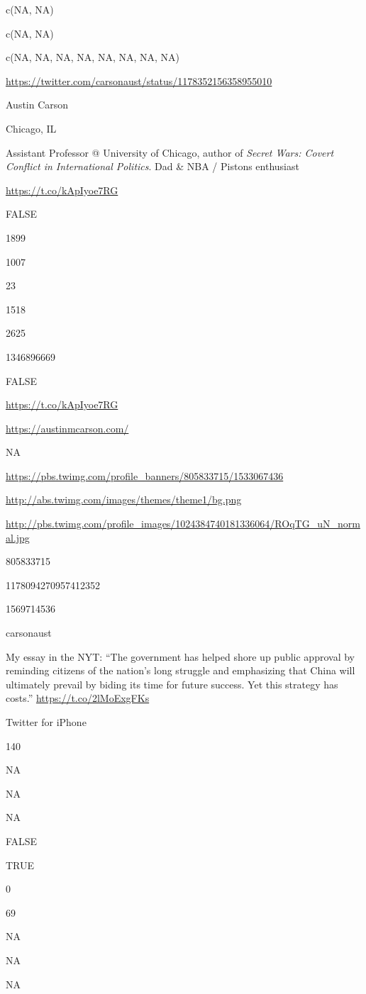 \documentclass[]{book}
\begin{document}
c(NA, NA)

c(NA, NA)

c(NA, NA, NA, NA, NA, NA, NA, NA)

\url{https://twitter.com/carsonaust/status/1178352156358955010}

Austin Carson

Chicago, IL

Assistant Professor @ University of Chicago, author of \emph{Secret
Wars: Covert Conflict in International Politics}. Dad \& NBA / Pistons
enthusiast

\url{https://t.co/kApIyoe7RG}

FALSE

1899

1007

23

1518

2625

1346896669

FALSE

\url{https://t.co/kApIyoe7RG}

\url{https://austinmcarson.com/}

NA

\url{https://pbs.twimg.com/profile_banners/805833715/1533067436}

\url{http://abs.twimg.com/images/themes/theme1/bg.png}

\url{http://pbs.twimg.com/profile_images/1024384740181336064/ROqTG_uN_normal.jpg}

805833715

1178094270957412352

1569714536

carsonaust

My essay in the NYT: ``The government has helped shore up public
approval by reminding citizens of the nation's long struggle and
emphasizing that China will ultimately prevail by biding its time for
future success. Yet this strategy has costs.''
\url{https://t.co/2lMoExgFKs}

Twitter for iPhone

140

NA

NA

NA

FALSE

TRUE

0

69

NA

NA

NA
\end{document}
